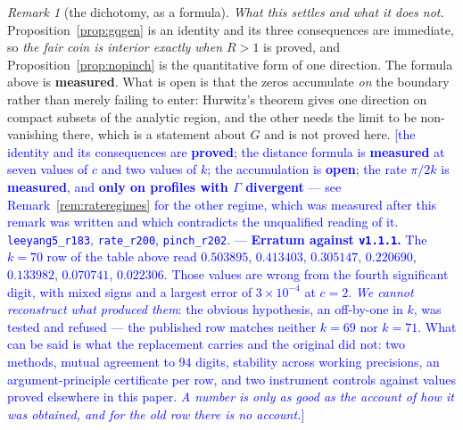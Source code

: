 \documentclass[11pt,a4paper]{article}
\theoremstyle{plain}
\theoremstyle{definition}
\theoremstyle{remark}
\newtheorem{remark}[theorem]{Remark}
\newcommand{\STATUS}[1]{\textcolor{blue}{\textsf{[#1]}}}
\begin{document}
\begin{remark}[the dichotomy, as a formula]
\emph{What this settles and what it does not.} Proposition~\ref{prop:gqgen} is an identity and
its three consequences are immediate, so \emph{the fair coin is interior exactly when $R>1$} is
proved, and Proposition~\ref{prop:nopinch} is the quantitative form of one direction. The
formula above is \textbf{measured}. What is open is that the zeros accumulate \emph{on} the
boundary rather than merely failing to enter: Hurwitz's theorem gives one direction on compact
subsets of the analytic region, and the other needs the limit to be non-vanishing there, which
is a statement about $G$ and is not proved here.
\STATUS{the identity and its consequences are \textbf{proved}; the distance formula is
\textbf{measured} at seven values of $c$ and two values of $k$; the accumulation is
\textbf{open}; the rate $\pi/2k$ is \textbf{measured}, and \textbf{only on profiles with
$\Gamma$ divergent} --- see Remark~\ref{rem:rateregimes} for the other regime, which was
measured after this remark was written and which contradicts the unqualified reading of it.
\texttt{leeyang5\_r183}, \texttt{rate\_r200}, \texttt{pinch\_r202}.
 \;--- \textbf{Erratum against \texttt{v1.1.1}.} The $k=70$ row of the table above read
$0.503895$, $0.413403$, $0.305147$, $0.220690$, $0.133982$, $0.070741$, $0.022306$. Those values
are wrong from the fourth significant digit, with mixed signs and a largest error of
$3\times10^{-4}$ at $c=2$. \emph{We cannot reconstruct what produced them}: the obvious
hypothesis, an off-by-one in $k$, was tested and refused --- the published row matches neither
$k=69$ nor $k=71$. What can be said is what the replacement carries and the original did not: two
methods, mutual agreement to $94$ digits, stability across working precisions, an
argument-principle certificate per row, and two instrument controls against values proved
elsewhere in this paper. \emph{A number is only as good as the account of how it was obtained,
and for the old row there is no account.}}
\end{remark}
\end{document}
